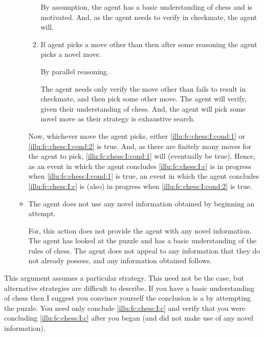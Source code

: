 \begin{note}
\begin{itemize}[leftmargin=*]
\begin{itemize}
\begin{enumerate}[label=\arabic*., ref=(\arabic*)]
        By assumption, the agent has a basic understanding of chess and is motivated.
        And, as the agent needs to verify  in checkmate, the agent will.
      \item
        \label{illu:fc:chess:I:cond:2}
        If agent picks a move other than  then after some reasoning the agent picks a novel move.%
        \smallskip

        By parallel reasoning.

        The agent needs only verify the move other than  fails to result in checkmate, and then pick some other move.
        The agent will verify, given their understanding of chess.
        And, the agent will pick some novel move as their strategy is exhaustive search.
      \end{enumerate}

      Now, whichever move the agent picks, either \ref{illu:fc:chess:I:cond:1} or \ref{illu:fc:chess:I:cond:2} is true.
      And, as there are finitely many moves for the agent to pick, \ref{illu:fc:chess:I:cond:1} will (eventually be true).
      Hence, as an event in which the agent concludes \ref{illu:fc:chess:I:c} is in progress when \ref{illu:fc:chess:I:cond:1} is true, an event in which the agent concludes \ref{illu:fc:chess:I:c} is (also) in progress when \ref{illu:fc:chess:I:cond:2} is true.

    \item
      The agent does not use any novel information obtained by beginning an attempt.

      For, this action does not provide the agent  with any novel information.
      The agent has looked at the puzzle and has a basic understanding of the rules of chess.
      The agent does not appeal to any information that they do not already possess, and any information obtained follows.
    \end{itemize}
  \end{itemize}

  This argument assumes a particular strategy.
  This need not be the case, but alternative strategies are difficult to describe.
  If you have a basic understanding of chess then I suggest you convince yourself the conclusion is a \fc{} by attempting the puzzle.
  You need only conclude \ref{illu:fc:chess:I:c} and verify that you were concluding \ref{illu:fc:chess:I:c} after you began (and did not make use of any novel information).
\end{note}


